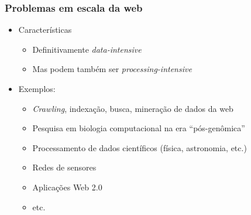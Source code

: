 \documentclass[Ligatures=TeX,table,brazil,svgnames,usetotalslideindicator,comp
ress,10pt]{beamer}
\begin{document}
\begin{frame}
  \frametitle{Problemas em escala da web}

  \begin{itemize}
  \item Características
    \begin{itemize}
    \item Definitivamente \textit{data-intensive}
    \item Mas podem também ser \textit{processing-intensive}
    \end{itemize}
  \item Exemplos:
    \begin{itemize}
    \item \textit{Crawling}, indexação, busca, mineração de dados da
      web
    \item Pesquisa em biologia computacional na era ``pós-genômica''
    \item Processamento de dados científicos (física, astronomia, etc.)
    \item Redes de sensores
    \item Aplicações Web 2.0
    \item etc.
    \end{itemize}
  \end{itemize}

\end{frame}
\end{document}
